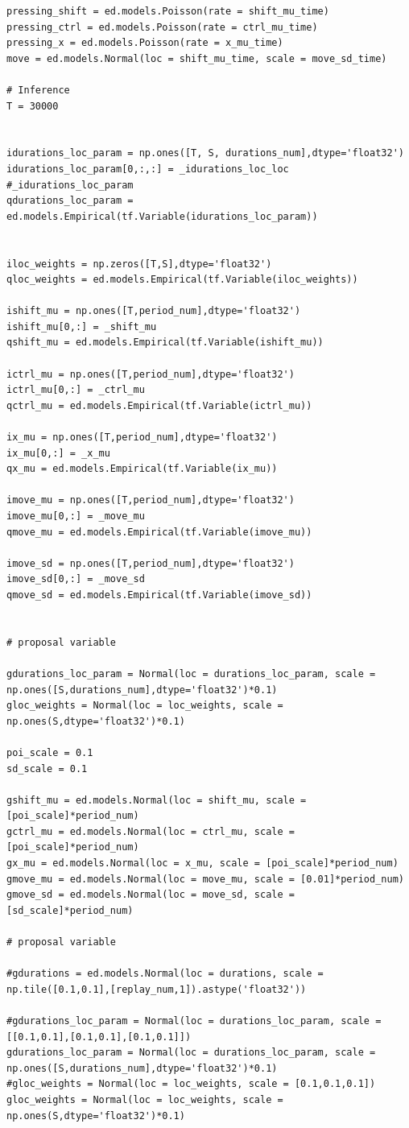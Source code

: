 \documentclass[UTF8]{ctexart}
\begin{document}
\begin{verbatim}
pressing_shift = ed.models.Poisson(rate = shift_mu_time)
pressing_ctrl = ed.models.Poisson(rate = ctrl_mu_time)
pressing_x = ed.models.Poisson(rate = x_mu_time)
move = ed.models.Normal(loc = shift_mu_time, scale = move_sd_time)

# Inference
T = 30000


idurations_loc_param = np.ones([T, S, durations_num],dtype='float32')
idurations_loc_param[0,:,:] = _idurations_loc_loc #_idurations_loc_param
qdurations_loc_param = ed.models.Empirical(tf.Variable(idurations_loc_param))


iloc_weights = np.zeros([T,S],dtype='float32') 
qloc_weights = ed.models.Empirical(tf.Variable(iloc_weights))

ishift_mu = np.ones([T,period_num],dtype='float32')
ishift_mu[0,:] = _shift_mu
qshift_mu = ed.models.Empirical(tf.Variable(ishift_mu))

ictrl_mu = np.ones([T,period_num],dtype='float32')
ictrl_mu[0,:] = _ctrl_mu
qctrl_mu = ed.models.Empirical(tf.Variable(ictrl_mu))

ix_mu = np.ones([T,period_num],dtype='float32')
ix_mu[0,:] = _x_mu
qx_mu = ed.models.Empirical(tf.Variable(ix_mu))

imove_mu = np.ones([T,period_num],dtype='float32')
imove_mu[0,:] = _move_mu
qmove_mu = ed.models.Empirical(tf.Variable(imove_mu))

imove_sd = np.ones([T,period_num],dtype='float32')
imove_sd[0,:] = _move_sd
qmove_sd = ed.models.Empirical(tf.Variable(imove_sd))


# proposal variable

gdurations_loc_param = Normal(loc = durations_loc_param, scale = np.ones([S,durations_num],dtype='float32')*0.1)
gloc_weights = Normal(loc = loc_weights, scale = np.ones(S,dtype='float32')*0.1)

poi_scale = 0.1 
sd_scale = 0.1 

gshift_mu = ed.models.Normal(loc = shift_mu, scale = [poi_scale]*period_num)
gctrl_mu = ed.models.Normal(loc = ctrl_mu, scale = [poi_scale]*period_num)
gx_mu = ed.models.Normal(loc = x_mu, scale = [poi_scale]*period_num)
gmove_mu = ed.models.Normal(loc = move_mu, scale = [0.01]*period_num)
gmove_sd = ed.models.Normal(loc = move_sd, scale = [sd_scale]*period_num)

# proposal variable

#gdurations = ed.models.Normal(loc = durations, scale = np.tile([0.1,0.1],[replay_num,1]).astype('float32'))

#gdurations_loc_param = Normal(loc = durations_loc_param, scale = [[0.1,0.1],[0.1,0.1],[0.1,0.1]])
gdurations_loc_param = Normal(loc = durations_loc_param, scale = np.ones([S,durations_num],dtype='float32')*0.1)
#gloc_weights = Normal(loc = loc_weights, scale = [0.1,0.1,0.1])
gloc_weights = Normal(loc = loc_weights, scale = np.ones(S,dtype='float32')*0.1)


\end{verbatim}
\end{document}
